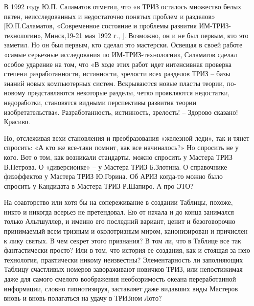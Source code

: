 \documentclass[11pt,a4paper]{article}
\begin{document}
В 1992 году Ю.П. Саламатов отметил, что «в ТРИЗ осталось множество белых
пятен, неисследованных и недостаточно понятых проблем и разделов»
[Ю.П.Саламатов, «Современное состояние и проблемы развития
  ИМ-ТРИЗ-технологии», Минск,19-21 мая 1992 г., ]. Возможно, он и не был
первым, кто это заметил. Но он был первым, кто сделал это мастерски. Освещая в
своей работе «самые серьезные исследования по ИМ-ТРИЗ-технологии», Саламатов
сделал особое ударение на том, что «В ходе этих работ идет интенсивная
проверка степени разработанности, истинности, зрелости всех разделов ТРИЗ --
базы знаний новых компьютерных систем. Вскрываются новые пласты теории,
по-новому представляются некоторые разделы, четко проявляются недостатки,
недоработки, становятся видными перспективы развития теории
изобретательства». Разработанность, истинность, зрелость! -- Здорово сказано!
Красиво.

Но, отслеживая вехи становления и преобразования «железной леди», так и тянет
спросить: «А кто же все-таки помнит, как все начиналось?» Но спросить не у
кого. Вот о том, как возникали стандарты, можно спросить у Мастера ТРИЗ
В.Петрова. О «диверсионке» -- у Мастера ТРИЗ Б.Злотина. О справочнике
физэффектов у Мастера ТРИЗ Ю.Горина. Об АРИЗ когда-то можно было спросить у
Кандидата в Мастера ТРИЗ Р.Шапиро. А про ЭТО?

На соавторство или хотя бы на сопереживание в создании Таблицы, похоже, никто
и никогда всерьез не претендовал. Ею от начала и до конца занимался только
Альтшуллер, и именно его последний вариант, ценит и безоговорочно принимаемый
всем тризным и околотризным миром, канонизирован и причислен к лику святых. В
чем секрет этого признания? В том ли, что в Таблице все так фантастически
просто? Или в том, что история ее создания, как и стоящая за нею технология,
практически никому неизвестны? Элементарность ли заполняющих Таблицу
счастливых номеров завораживают новичков ТРИЗ, или непостижимая даже для
самого смелого воображения необозримость океана переработанной информации,
словно гипнотизируя, заставляет даже видавших виды Мастеров вновь и вновь
полагаться на удачу в ТРИЗном Лото?
\end{document}
